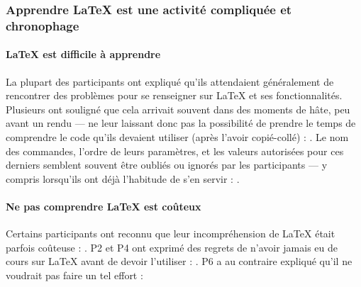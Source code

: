 \subsubsection{\printthemenumber{} Apprendre \LaTeX{} est une activité compliquée et chronophage}

\paragraph{\LaTeX{} est difficile à apprendre}
La plupart des participants ont expliqué qu'ils attendaient généralement de rencontrer des problèmes pour se renseigner sur \LaTeX{} et ses fonctionnalités.
Plusieurs ont souligné que cela arrivait souvent dans des moments de hâte, peu avant un rendu --- ne leur laissant donc pas la possibilité de prendre le temps de comprendre le code qu'ils devaient utiliser (après l'avoir copié-collé) : .
Le nom des commandes, l'ordre de leurs paramètres, et les valeurs autorisées pour ces derniers semblent souvent être oubliés ou ignorés par les participants --- y compris lorsqu'ils ont déjà l'habitude de s'en servir : .

\paragraph{Ne pas comprendre \LaTeX{} est coûteux}
Certains participants ont reconnu que leur incompréhension de \LaTeX{} était parfois coûteuse : .
P2 et P4 ont exprimé des regrets de n'avoir jamais eu de cours sur \LaTeX{} avant de devoir l'utiliser : .
P6 a au contraire expliqué qu'il ne voudrait pas faire un tel effort : 

